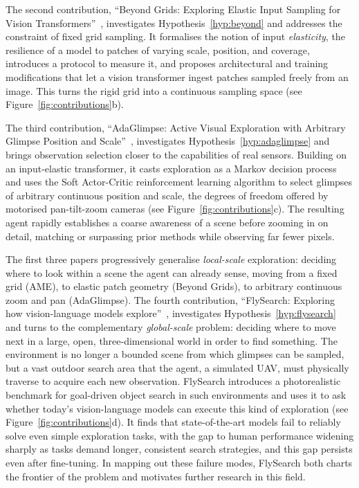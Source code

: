 The second contribution, ``Beyond Grids: Exploring Elastic Input Sampling for Vision Transformers''~, investigates Hypothesis~\ref{hyp:beyond} and addresses the constraint of fixed grid sampling.
It formalises the notion of input \emph{elasticity}, the resilience of a model to patches of varying scale, position, and coverage, introduces a protocol to
measure it, and proposes architectural and training modifications that let a vision transformer ingest patches sampled freely from an image. This turns the rigid grid into a continuous sampling space (see Figure~\ref{fig:contributions}b).

The third contribution, ``AdaGlimpse: Active Visual Exploration with Arbitrary Glimpse Position and Scale''~, investigates Hypothesis~\ref{hyp:adaglimpse} and brings observation selection closer to the capabilities of real sensors. Building on an input-elastic transformer, it casts exploration as a Markov decision process and uses the Soft Actor-Critic
reinforcement learning algorithm to select glimpses of arbitrary continuous position and scale, the degrees of freedom offered by
motorised pan-tilt-zoom cameras (see Figure~\ref{fig:contributions}c). The resulting agent rapidly establishes a coarse awareness of a scene before zooming in on detail, matching or surpassing prior
methods while observing far fewer pixels.

The first three papers progressively generalise \emph{local-scale} exploration: deciding
where to look within a scene the agent can already sense, moving from a fixed grid (AME), to
elastic patch geometry (Beyond Grids), to arbitrary continuous zoom and pan (AdaGlimpse). The
fourth contribution, ``FlySearch: Exploring how vision-language models explore''~, investigates Hypothesis~\ref{hyp:flysearch} and turns to the complementary \emph{global-scale} problem: deciding where
to move next in a large, open, three-dimensional world in order to find something. The environment
is no longer a bounded scene from which glimpses can be sampled, but a vast outdoor search area
that the agent, a simulated UAV, must physically traverse to acquire each new observation. FlySearch introduces a photorealistic benchmark for goal-driven object search in such
environments and uses it to ask whether today's vision-language models can execute this kind of exploration (see Figure~\ref{fig:contributions}d). It finds that
state-of-the-art models fail to reliably solve even simple exploration tasks,
with the gap to human performance widening sharply as tasks demand longer,
consistent search strategies, and this gap persists even after fine-tuning. In
mapping out these failure modes, FlySearch both charts the frontier of the
problem and motivates further research in this field.

